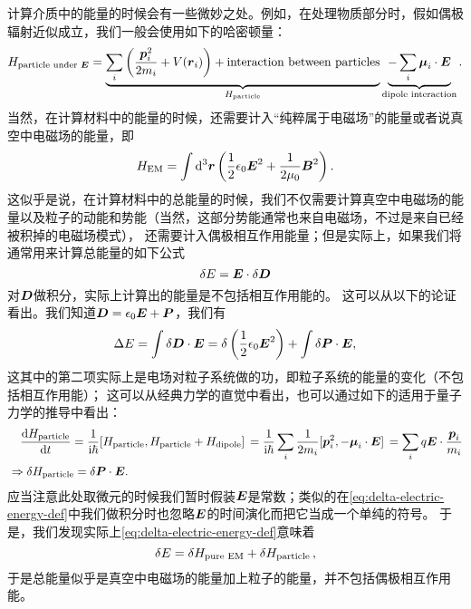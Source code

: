 计算介质中的能量的时候会有一些微妙之处。例如，在处理物质部分时，假如偶极辐射近似成立，我们一般会使用如下的哈密顿量：
\begin{equation}
    H_{\text{particle under $\vb*{E}$}} = \underbrace{
        \sum_{i} \left(
            \frac{\vb*{p}_i^2}{2m_i} + V(\vb*{r}_i)
        \right) + \text{interaction between particles}
    }_{H_{\text{particle}}}
    \underbrace{
        - \sum_i \vb*{\mu}_i \cdot \vb*{E}
    }_{\text{dipole interaction}}.
\end{equation}
当然，在计算材料中的能量的时候，还需要计入“纯粹属于电磁场”的能量或者说真空中电磁场的能量，即
\begin{equation}
    H_{\text{EM}} = \int \dd[3]{\vb*{r}} \left(
        \frac{1}{2} \epsilon_0 \vb*{E}^2 
        + \frac{1}{2 \mu_0} \vb*{B}^2
    \right).
\end{equation}
这似乎是说，在计算材料中的总能量的时候，我们不仅需要计算真空中电磁场的能量以及粒子的动能和势能（当然，这部分势能通常也来自电磁场，不过是来自已经被积掉的电磁场模式），
还需要计入偶极相互作用能量；但是实际上，如果我们将通常用来计算总能量的如下公式
\begin{equation}
    \var{E} = \vb*{E} \cdot \var{\vb*{D}}
\end{equation}
对$\vb*{D}$做积分，实际上计算出的能量是不包括相互作用能的。
这可以从以下的论证看出。我们知道$\vb*{D} = \epsilon_0 \vb*{E} + \vb*{P}$，我们有
\begin{equation}
    \Delta E = \int \var{\vb*{D}} \cdot \vb*{E} = \var \left(\frac{1}{2} \epsilon_0 \vb*{E}^2\right) 
    + \int \var{\vb*{P}} \cdot \vb*{E} ,
    \label{eq:delta-electric-energy-def}
\end{equation}
这其中的第二项实际上是电场对粒子系统做的功，即粒子系统的能量的变化（不包括相互作用能）；
这可以从经典力学的直觉中看出，也可以通过如下的适用于量子力学的推导中看出：
\begin{equation}
    \begin{aligned}
        &\quad \dv{H_{\text{particle}}}{t} = \frac{1}{\ii \hbar} \comm*{H_{\text{particle}}}{H_{\text{particle}} + H_{\text{dipole}}}
        = \frac{1}{\ii \hbar} \sum_i \frac{1}{2 m_i} \comm*{\vb*{p}_i^2}{- \vb*{\mu}_i \cdot \vb*{E}}
        = \sum_i q \vb*{E} \cdot \frac{\vb*{p}_i}{m_i} \\
        &\Rightarrow \var{H_{\text{particle}}} = \var{\vb*{P}} \cdot \vb*{E}.
    \end{aligned}
\end{equation}
应当注意此处取微元的时候我们暂时假装$\vb*{E}$是常数；类似的在\eqref{eq:delta-electric-energy-def}中我们做积分时也忽略$\vb*{E}$的时间演化而把它当成一个单纯的符号。
于是，我们发现实际上\eqref{eq:delta-electric-energy-def}意味着
\begin{equation}
    \var{E} = \var{H_{\text{pure EM}}} + \var{H_{\text{particle}}},
\end{equation}
于是总能量似乎是真空中电磁场的能量加上粒子的能量，并不包括偶极相互作用能。

